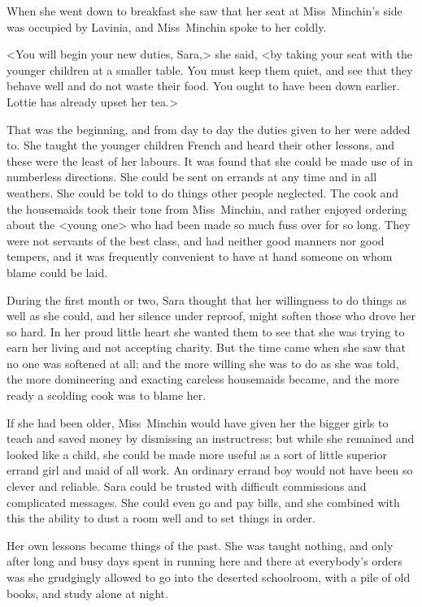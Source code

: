 When she went down to breakfast she saw that her seat at Miss~Minchin's side was occupied by Lavinia, and Miss~Minchin spoke to her coldly.

<You will begin your new duties, Sara,> she said, <by taking your seat with the younger children at a smaller table. You must keep them quiet, and see that they behave well and do not waste their food. You ought to have been down earlier. Lottie has already upset her tea.>

That was the beginning, and from day to day the duties given to her were added to. She taught the younger children French and heard their other lessons, and these were the least of her labours. It was found that she could be made use of in numberless directions. She could be sent on errands at any time and in all weathers. She could be told to do things other people neglected. The cook and the housemaids took their tone from Miss~Minchin, and rather enjoyed ordering about the <young one> who had been made so much fuss over for so long. They were not servants of the best class, and had neither good manners nor good tempers, and it was frequently convenient to have at hand someone on whom blame could be laid.

During the first month or two, Sara thought that her willingness to do things as well as she could, and her silence under reproof, might soften those who drove her so hard. In her proud little heart she wanted them to see that she was trying to earn her living and not accepting charity. But the time came when she saw that no one was softened at all; and the more willing she was to do as she was told, the more domineering and exacting careless housemaids became, and the more ready a scolding cook was to blame her.

If she had been older, Miss~Minchin would have given her the bigger girls to teach and saved money by dismissing an instructress; but while she remained and looked like a child, she could be made more useful as a sort of little superior errand girl and maid of all work. An ordinary errand boy would not have been so clever and reliable. Sara could be trusted with difficult commissions and complicated messages. She could even go and pay bills, and she combined with this the ability to dust a room well and to set things in order.

Her own lessons became things of the past. She was taught nothing, and only after long and busy days spent in running here and there at everybody's orders was she grudgingly allowed to go into the deserted schoolroom, with a pile of old books, and study alone at night.

